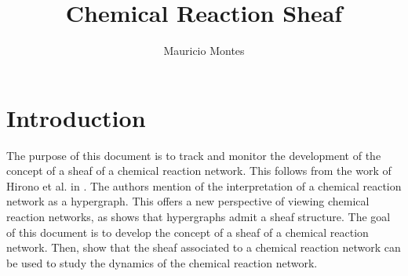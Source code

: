 \documentclass[12pt]{article}
\author{Mauricio Montes}
\title{Chemical Reaction Sheaf}
\theoremstyle{definition}
\newcommand{\<}{\langle}
\renewcommand{\>}{\rangle}
\begin{document}
\maketitle

\section{Introduction}

The purpose of this document is to track and monitor the development of the concept of
a sheaf of a chemical reaction network. This follows from the work of Hirono et al. in 
\cite{Hirono2021}. The authors mention of the interpretation of a chemical reaction network
as a hypergraph. This offers a new perspective of viewing chemical reaction networks, as 
\cite{duta2023sheaf} shows that hypergraphs admit a sheaf structure. The goal of this document
is to develop the concept of a sheaf of a chemical reaction network. Then, show that the 
sheaf associated to a chemical reaction network can be used to study the dynamics of the
chemical reaction network.

\begin{comment}%

\section{Definitions}

\subsection{Topology}

\subsection{Simplicial Complexes}

\subsection{Simplicial Homology}

\subsection{Simplicial Cohomology}

\subsection{Chemical Reaction Network}

\end{comment}%
\end{document}
